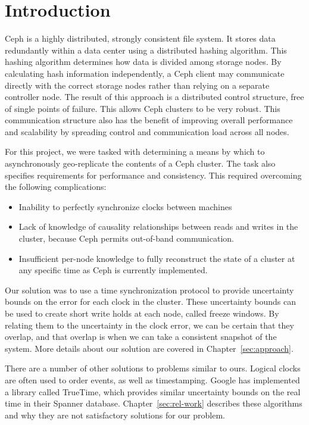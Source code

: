 \chapter{Introduction}
\label{sec:introduction}

Ceph is a highly distributed, strongly consistent file system. It
stores data redundantly within a data center using a distributed hashing
algorithm. This hashing algorithm determines how data is divided among
storage nodes.  By calculating hash information independently, a Ceph
client may communicate directly with the correct storage nodes rather
than relying on a separate controller node. The result of this
approach is a distributed control structure, free of single points of
failure. This allows Ceph clusters to be very robust. This
communication structure also has the benefit of improving overall
performance and scalability by spreading control and communication
load across all nodes.

For this project, we were tasked with determining a means by which to
asynchronously geo-replicate the contents of a Ceph cluster. The task
also specifies requirements for performance and consistency. This
required overcoming the following complications:

\begin{itemize}
\item Inability to perfectly synchronize clocks between machines
\item Lack of knowledge of causality relationships between reads and
  writes in the cluster, because Ceph permits out-of-band
  communication.
\item Insufficient per-node knowledge to fully reconstruct the state
  of a cluster at any specific time as Ceph is currently implemented.
\end{itemize}

Our solution was to use a time synchronization protocol to provide
uncertainty bounds on the error for each clock in the cluster. These
uncertainty bounds can be used to create short write holds at each node, 
called freeze windows. By relating them to the uncertainty in the clock error,
we can be certain that they overlap, and that overlap is when we can take a
consistent snapshot of the system. More details about our solution are covered 
in Chapter~\ref{sec:approach}.

There are a number of other solutions to problems similar to ours. Logical
clocks are often used to order events, as well as timestamping. Google has
implemented a library called TrueTime, which provides similar uncertainty
bounds on the real time in their Spanner database. Chapter~\ref{sec:rel-work} 
describes these algorithms and why they are not satisfactory solutions for our 
problem.

